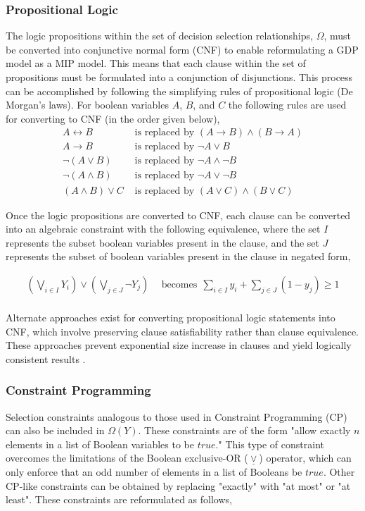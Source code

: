 \documentclass{juliacon}
\begin{document}
\subsubsection{Propositional Logic}
The logic propositions within the set of decision selection relationships, $\Omega$, must be converted into conjunctive normal form (CNF) to enable reformulating a GDP model as a MIP model. This means that each clause within the set of propositions must be formulated into a conjunction of disjunctions. This process can be accomplished by following the simplifying rules of propositional logic (De Morgan's laws). For boolean variables $A$, $B$, and $C$ the following rules are used for converting to CNF (in the order given below),
\begin{align*}
    A \leftrightarrow B & \text{ is replaced by } (A \rightarrow B) \land (B \rightarrow A) \\
    A \rightarrow B & \text{ is replaced by } \lnot A \lor B \\
    \lnot(A \lor B) & \text{ is replaced by } \lnot A \land \lnot B \\
    \lnot(A \land B) & \text{ is replaced by } \lnot A \lor \lnot B \\
    (A \land B) \lor C & \text{ is replaced by } (A \lor C) \land (B \lor C)
\end{align*}

Once the logic propositions are converted to CNF, each clause can be converted into an algebraic constraint with the following equivalence, where the set $I$ represents the subset boolean variables present in the clause, and the set $J$ represents the subset of boolean variables present in the clause in negated form,

\begin{align*}
    \left(\bigvee_{i \in I} Y_i\right) \vee \left(\bigvee_{j \in J} \neg Y_j\right) & \ \ \text{becomes} \ \ \sum_{i \in I} y_i + \sum_{j \in J} (1-y_j) \geq 1 \\
\end{align*}

Alternate approaches exist for converting propositional logic statements into CNF, which involve preserving clause satisfiability rather than clause equivalence. These approaches prevent exponential size increase in clauses and yield logically consistent results \cite{jackson_sheridan_2005}.

\subsubsection{Constraint Programming}
Selection constraints analogous to those used in Constraint Programming (CP) can also be included in $\Omega(Y)$. These constraints are of the form "allow exactly $n$ elements in a list of Boolean variables to be $true$." This type of constraint overcomes the limitations of the Boolean exclusive-OR ($\underline{\vee}$) operator, which can only enforce that an odd number of elements in a list of Booleans be $true$. Other CP-like constraints can be obtained by replacing "exactly" with "at most" or "at least". These constraints are reformulated as follows,
\end{document}
